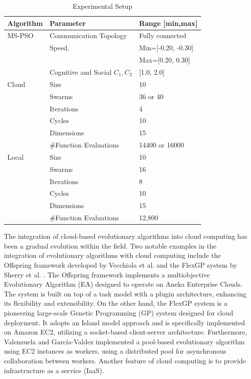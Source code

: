 \documentclass{cys}
\begin{document}
\begin{table}[ht]
\centering
\caption{Experimental Setup}\label{tab:alg_params}
\setlength{\tabcolsep}{10pt}
\begin{tabular}{l l l}
\hline
\textbf{Algorithm} & \textbf{Parameter}	& \textbf{Range [min,max]}\\ \hline
MS-PSO & Communication Topology & Fully connected  \\
& Speed.       & Min=[-0.20, -0.30] \\
&              & Max=[0.20, 0.30]  \\
& Cognitive and Social $C_1,C_2$ &  [1.0, 2.0]  \\ \hline
Cloud       & Size              & 10       \\
            & Swarms            & 36 or 40 \\
            & Iterations        &  4       \\
            & Cycles            & 10       \\
            & Dimensions        & 15       \\   
            & \#Function Evaluations   & 14400 or 16000\\ \hline
Local       & Size              & 10       \\
            & Swarms            & 16       \\
            & Iterations        &  8       \\
            & Cycles            & 10       \\
            & Dimensions        & 15       \\   
            & \#Function Evaluations   & 12,800   \\ \hline
\end{tabular}
\end{table}

The integration of cloud-based evolutionary algorithms into cloud computing has been a 
gradual evolution within the field. Two notable examples in the integration of evolutionary algorithms with cloud computing 
include the Offspring framework developed by Vecchiola et al. \cite{vecchiola2009multi} 
and the FlexGP system by Sherry et al. \cite{FlexGP}.
The Offspring framework implements a multiobjective Evolutionary Algorithm (EA) 
designed to operate on Aneka Enterprise Clouds. The system is built on top of a task 
model with a plugin architecture, enhancing its flexibility and extensibility.
On the other hand, the FlexGP system is a pioneering large-scale Genetic Programming (GP) system
designed for cloud deployment. It adopts an Island model approach and is specifically 
implemented on Amazon EC2, utilizing a socket-based client-server architecture. Furthermore, 
Valenzuela and García-Valdez \cite{valenzuela2015implementing} implemented a pool-based evolutionary 
algorithm using EC2 instances as workers, using a distributed pool for asynchronous collaboration 
between workers. Another feature of cloud computing is to provide infrastructure as a service (IaaS). 
\end{document}
